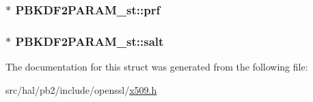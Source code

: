 \subsubsection[{\texorpdfstring{prf}{prf}}]{$\ast$ P\+B\+K\+D\+F2\+P\+A\+R\+A\+M\+\_\+st\+::prf}\hypertarget{struct_p_b_k_d_f2_p_a_r_a_m__st_ac2bdfe036b70c95d5b58e61c1b786fc1}{}\label{struct_p_b_k_d_f2_p_a_r_a_m__st_ac2bdfe036b70c95d5b58e61c1b786fc1}
\subsubsection[{\texorpdfstring{salt}{salt}}]{$\ast$ P\+B\+K\+D\+F2\+P\+A\+R\+A\+M\+\_\+st\+::salt}\hypertarget{struct_p_b_k_d_f2_p_a_r_a_m__st_aa81f35e6d5ec790f7265b17be3a6d163}{}\label{struct_p_b_k_d_f2_p_a_r_a_m__st_aa81f35e6d5ec790f7265b17be3a6d163}


The documentation for this struct was generated from the following file\+:\begin{DoxyCompactItemize}
\item 
src/hal/pb2/include/openssl/\hyperlink{x509_8h}{x509.\+h}\end{DoxyCompactItemize}
